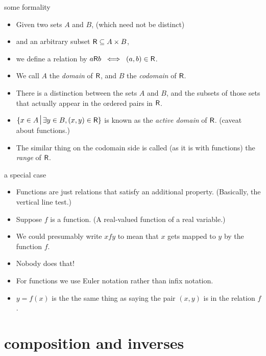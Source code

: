 \documentclass[handout,landscape]{beamer}
\begin{document}
\begin{frame}{some formality}
\begin{itemize}

\item Given two sets $A$ and $B$, \pause (which need not be distinct\textellipsis) \pause
\item and an arbitrary subset $\mbox{\textsf R} \subseteq A \times B$, \pause
\item we define a relation by $a \mbox{\textsf R} b \; \iff \; (a,b) \in \mbox{\textsf R}$. \pause
\item We call $A$ the {\em domain} of $\mbox{\textsf R}$, \pause \newline
      and $B$ the {\em codomain} of $\mbox{\textsf R}$. \pause
\item There is a distinction between the sets $A$ and $B$, and the subsets of those sets that actually appear in the ordered pairs in $\mbox{\textsf R}$. \pause
\item $\displaystyle \{x \in A \suchthat \exists y \in B, (x,y) \in \relR \}$ is known as the {\em active domain} of $\mbox{\textsf R}$. \pause (caveat about functions.) \pause
\item The similar thing on the codomain side is called (as it is with functions) the {\em range} of $\mbox{\textsf R}$.

\end{itemize}
\end{frame}


\begin{frame}{a special case}
\begin{itemize}
\item Functions are just relations that satisfy an additional property. \pause \newline
(Basically, the vertical line test.) \pause
\item Suppose $f$ is a function. \pause
(A real-valued function of a real variable.) \pause
\item We could presumably write $xfy$ to mean that $x$ gets mapped to $y$ by the function $f$. \pause
\item Nobody does that! \pause
\item For functions we use Euler notation rather than infix notation. \pause
\item $y = f(x)$ is the the same thing as saying the pair $(x,y)$ is in the relation $f$.

\end{itemize}
\end{frame}


\section{composition and inverses}
\end{document}
